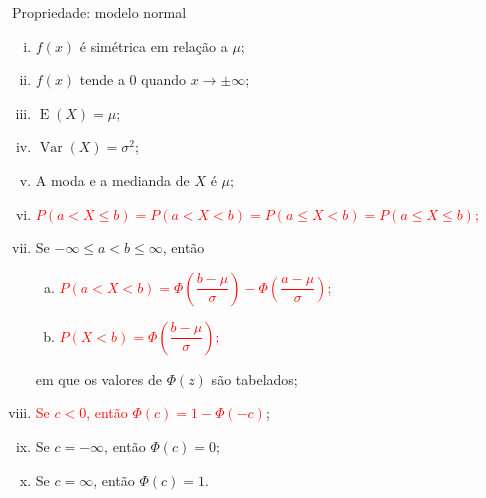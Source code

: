 \documentclass[9pt]{beamer}
\DeclareMathOperator{\espe}{E}
\DeclareMathOperator{\vari}{Var}
\begin{document}
\begin{frame}{Propriedade: modelo normal}
 \begin{enumerate}[i)]
 \item $f(x)$ é simétrica em relação a $\mu$;
 \vfill
 
 \item $f(x)$ tende a $0$ quando $x \rightarrow \pm \infty$;
 \vfill
 
 \item $\espe(X)= \mu$;
 \vfill
 
 \item $\vari(X) =\sigma^2$;
 \vfill
 
 \item A moda e a medianda de $X$ é $\mu$;
 \vfill
 
 \item \textcolor{red}{ $P(a < X \leq b) = P(a < X < b) = P(a \leq X < b) = P(a \leq X \leq b)$;}
 \vfill
 
 \item Se $-\infty \leq a < b \leq \infty$, então
 \begin{enumerate}[a)]
  \item \textcolor{red}{$P(a < X < b) = \Phi\left( \dfrac{b-\mu}{\sigma} \right) - \Phi\left( \dfrac{a-\mu}{\sigma} \right)$;}
  \item \textcolor{red}{$P(X < b) = \Phi\left( \dfrac{b-\mu}{\sigma} \right)$;}
 \end{enumerate}
 em que os valores de $\Phi(z)$ são tabelados;
 \vfill
 
 \item \textcolor{red}{ Se $c < 0$, então $\Phi(c) = 1 - \Phi(-c)$};
 \vfill
 
 \item Se $c= -\infty$, então $\Phi(c) = 0$;
 \vfill
 
 \item Se $c = \infty$, então $\Phi(c) = 1$.
\end{enumerate}
\end{frame}
\end{document}
